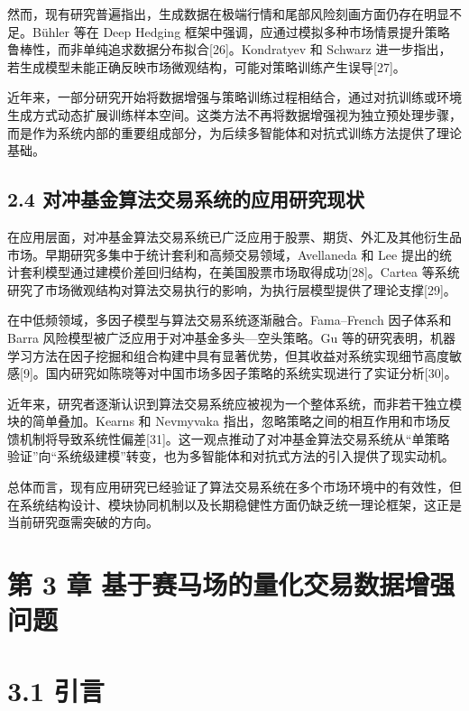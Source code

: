 \documentclass[UTF8]{ctexart}
\begin{document}
然而，现有研究普遍指出，生成数据在极端行情和尾部风险刻画方面仍存在明显不足。Bühler
等在 Deep Hedging
框架中强调，应通过模拟多种市场情景提升策略鲁棒性，而非单纯追求数据分布拟合{[}26{]}。Kondratyev
和 Schwarz
进一步指出，若生成模型未能正确反映市场微观结构，可能对策略训练产生误导{[}27{]}。

近年来，一部分研究开始将数据增强与策略训练过程相结合，通过对抗训练或环境生成方式动态扩展训练样本空间。这类方法不再将数据增强视为独立预处理步骤，而是作为系统内部的重要组成部分，为后续多智能体和对抗式训练方法提供了理论基础。

\subsection{2.4
对冲基金算法交易系统的应用研究现状}\label{ux5bf9ux51b2ux57faux91d1ux7b97ux6cd5ux4ea4ux6613ux7cfbux7edfux7684ux5e94ux7528ux7814ux7a76ux73b0ux72b6}

在应用层面，对冲基金算法交易系统已广泛应用于股票、期货、外汇及其他衍生品市场。早期研究多集中于统计套利和高频交易领域，Avellaneda
和 Lee
提出的统计套利模型通过建模价差回归结构，在美国股票市场取得成功{[}28{]}。Cartea
等系统研究了市场微观结构对算法交易执行的影响，为执行层模型提供了理论支撑{[}29{]}。

在中低频领域，多因子模型与算法交易系统逐渐融合。Fama--French 因子体系和
Barra 风险模型被广泛应用于对冲基金多头---空头策略。Gu
等的研究表明，机器学习方法在因子挖掘和组合构建中具有显著优势，但其收益对系统实现细节高度敏感{[}9{]}。国内研究如陈晓等对中国市场多因子策略的系统实现进行了实证分析{[}30{]}。

近年来，研究者逐渐认识到算法交易系统应被视为一个整体系统，而非若干独立模块的简单叠加。Kearns
和 Nevmyvaka
指出，忽略策略之间的相互作用和市场反馈机制将导致系统性偏差{[}31{]}。这一观点推动了对冲基金算法交易系统从``单策略验证''向``系统级建模''转变，也为多智能体和对抗式方法的引入提供了现实动机。

总体而言，现有应用研究已经验证了算法交易系统在多个市场环境中的有效性，但在系统结构设计、模块协同机制以及长期稳健性方面仍缺乏统一理论框架，这正是当前研究亟需突破的方向。

\section{第 3 章
基于赛马场的量化交易数据增强问题}\label{ux7b2c-3-ux7ae0-ux57faux4e8eux8d5bux9a6cux573aux7684ux91cfux5316ux4ea4ux6613ux6570ux636eux589eux5f3aux95eeux9898}

\section{3.1 引言}\label{ux5f15ux8a00}
\end{document}
